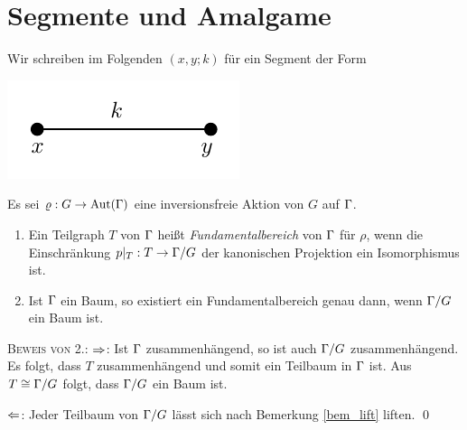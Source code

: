 \documentclass[a4paper, 12pt, twoside]{article}
\begin{document}
\section{Segmente und Amalgame}\label{sec_seg}

Wir schreiben im Folgenden $(x,y;k)$ für ein Segment
der Form
\begin{center}
	\includegraphics{grugraImages/segment}
\end{center}

\DB Es sei $\varrho:G\rightarrow\mathrm{Aut}(\Gamma)$ eine inversionsfreie Aktion von $G$
auf $\Gamma$.
\begin{enumerate}
\item Ein Teilgraph $T$ von $\Gamma$ heißt \emph{Fundamentalbereich}
von $\Gamma$ für $\rho$, wenn die Einschränkung
$p|_T : T \rightarrow \Gamma/G$
der kanonischen Projektion ein Isomorphismus ist.
\item Ist $\Gamma$ ein Baum, so existiert ein Fundamentalbereich genau
dann, wenn $\Gamma/G$ ein Baum ist.
\end{enumerate}
\textsc{Beweis von 2.:} \glqq$\Rightarrow$\grqq: Ist $\Gamma$ zusammenhängend,
so ist auch $\Gamma/G$ zusammenhängend. Es folgt, dass $T$ 
zusammenhängend und somit ein Teilbaum in $\Gamma$ ist.
Aus $T\cong \Gamma/G$ folgt, dass $\Gamma/G$ ein Baum ist.

\glqq$\Leftarrow$\grqq: Jeder Teilbaum von $\Gamma/G$ lässt sich nach
Bemerkung \ref{bem_lift} liften.
\qed
\end{document}
